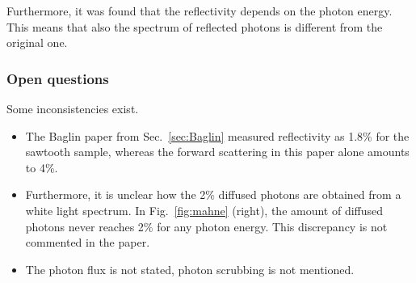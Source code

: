 Furthermore, it was found that the reflectivity depends on the photon energy.
This means that also the spectrum of reflected photons is different from the original one.


\subsubsection{Open questions}
Some inconsistencies exist.
\begin{itemize}
    \item The Baglin paper from Sec.~\ref{sec:Baglin} measured reflectivity as 1.8\% for the sawtooth sample, whereas the forward scattering in this paper alone amounts to 4\%.
    \item Furthermore, it is unclear how the 2\% diffused photons are obtained from a white light spectrum.
        In Fig.~\ref{fig:mahne} (right), the amount of diffused photons never reaches 2\% for any photon energy.
        This discrepancy is not commented in the paper.
    \item The photon flux is not stated, photon scrubbing is not mentioned.
\end{itemize}


